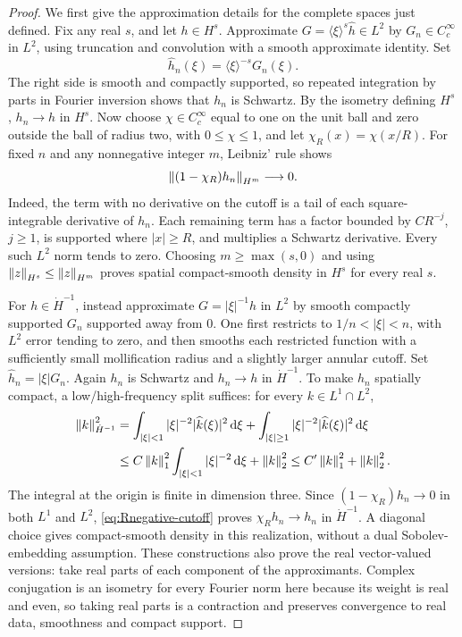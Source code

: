 \begin{proof}
We first give the approximation details for the complete spaces just defined. Fix any real $s$, and let $h\in H^s$. Approximate $G=\langle\xi\rangle^s\widehat h\in L^2$ by $G_n\in C_c^\infty$ in $L^2$, using truncation and convolution with a smooth approximate identity. Set
\[
 \widehat h_n(\xi)=\langle\xi\rangle^{-s}G_n(\xi).
\]
The right side is smooth and compactly supported, so repeated integration by parts in Fourier inversion shows that $h_n$ is Schwartz. By the isometry defining $H^s$, $h_n\to h$ in $H^s$. Now choose $\chi\in C_c^\infty$ equal to one on the unit ball and zero outside the ball of radius two, with $0\le\chi\le1$, and let $\chi_R(x)=\chi(x/R)$. For fixed $n$ and any nonnegative integer $m$, Leibniz' rule shows
\[
 \left\lVert(1-\chi_R)h_n\right\rVert_{H^m}\longrightarrow0.
\]
Indeed, the term with no derivative on the cutoff is a tail of each square-integrable derivative of $h_n$. Each remaining term has a factor bounded by $C R^{-j}$, $j\ge1$, is supported where $|x|\ge R$, and multiplies a Schwartz derivative. Every such $L^2$ norm tends to zero. Choosing $m\ge\max(s,0)$ and using $\left\lVert z\right\rVert_{H^s}\le\left\lVert z\right\rVert_{H^m}$ proves spatial compact-smooth density in $H^s$ for every real $s$.

For $h\in\dot H^{-1}$, instead approximate $G=|\xi|^{-1}\widehat h$ in $L^2$ by smooth compactly supported $G_n$ supported away from $0$. One first restricts to $1/n<|\xi|<n$, with $L^2$ error tending to zero, and then smooths each restricted function with a sufficiently small mollification radius and a slightly larger annular cutoff. Set $\widehat h_n=|\xi|G_n$. Again $h_n$ is Schwartz and $h_n\to h$ in $\dot H^{-1}$. To make $h_n$ spatially compact, a low/high-frequency split suffices: for every $k\in L^1\cap L^2$,
\begin{align}
 \left\lVert k\right\rVert_{\dot H^{-1}}^2
 &=\int_{|\xi|<1}|\xi|^{-2}|\widehat k(\xi)|^2\,\mathrm d\xi
    +\int_{|\xi|\ge1}|\xi|^{-2}|\widehat k(\xi)|^2\,\mathrm d\xi\nonumber\\
 &\le C\left\lVert k\right\rVert_1^2\int_{|\xi|<1}|\xi|^{-2}\,\mathrm d\xi+\left\lVert k\right\rVert_2^2
 \le C'\left\lVert k\right\rVert_1^2+\left\lVert k\right\rVert_2^2.\label{eq:Rnegative-cutoff}
\end{align}
The integral at the origin is finite in dimension three. Since $(1-\chi_R)h_n\to0$ in both $L^1$ and $L^2$, \eqref{eq:Rnegative-cutoff} proves $\chi_Rh_n\to h_n$ in $\dot H^{-1}$. A diagonal choice gives compact-smooth density in this realization, without a dual Sobolev-embedding assumption. These constructions also prove the real vector-valued versions: take real parts of each component of the approximants. Complex conjugation is an isometry for every Fourier norm here because its weight is real and even, so taking real parts is a contraction and preserves convergence to real data, smoothness and compact support.


\end{proof}
